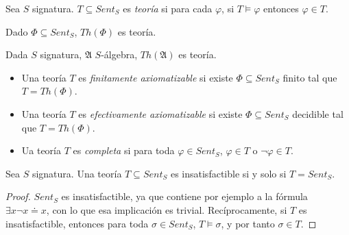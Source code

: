 \begin{definition}
Sea $S$ signatura. $T \subseteq Sent_S$ es \textit{teoría} si para cada $\varphi$, si $T \vDash \varphi$ entonces $\varphi \in T$.
\end{definition}

\begin{example}
Dado $\Phi \subseteq Sent_S$, $Th(\Phi)$ es teoría.
\end{example}
\begin{example}
Dada $S$ signatura, $\mathfrak{A}$ $S$-álgebra, $Th(\mathfrak{A})$ es teoría. 
\end{example}

\begin{defs*}\mbox{}
\begin{itemize}
    \item Una teoría $T$ es \textit{finitamente axiomatizable} si existe $\Phi \subseteq Sent_S$ finito tal que $T=Th(\Phi)$.
    \item Una teoría $T$ es \textit{efectivamente axiomatizable} si existe $\Phi \subseteq Sent_S$ decidible tal que $T=Th(\Phi)$.
    \item Ua teoría $T$ es \textit{completa} si para toda $\varphi \in Sent_S$, $\varphi \in T$ o $\neg \varphi \in T$.
\end{itemize}
\end{defs*}

\begin{lema}
Sea $S$ signatura. Una teoría $T \subseteq Sent_S$ es insatisfactible si y solo si $T = Sent_S$.
\end{lema}
\begin{proof}
$Sent_S$ es insatisfactible, ya que contiene por ejemplo a la fórmula $\exists x\neg x\doteq x$, con lo que esa implicación es trivial. Recíprocamente, si $T$ es insatisfactible, entonces para toda $\sigma \in Sent_S$, $T \vDash \sigma$, y por tanto $\sigma \in T$.
\end{proof}


